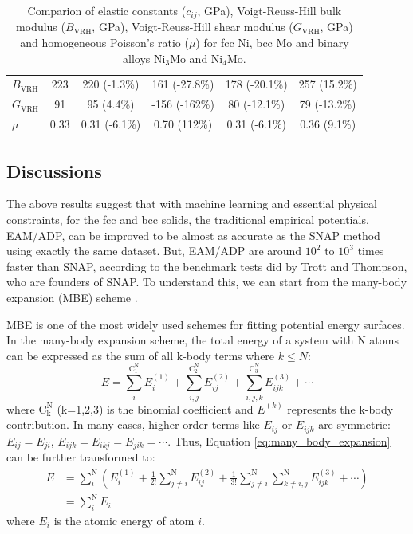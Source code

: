 \documentclass[final,3p,times]{elsarticle}
\begin{document}
\begin{table}
\begin{tabular}{lccccc}
$B_{\mathrm{VRH}}$ & 223  & 220 (-1.3\%)     & 161 (-27.8\%)   & 178 (-20.1\%) & 257 (15.2\%)  \\
$G_{\mathrm{VRH}}$ & 91   & 95 (4.4\%)       & -156 (-162\%)   & 80 (-12.1\%)  & 79 (-13.2\%)  \\
$\mu$              & 0.33 & 0.31 (-6.1\%)    & 0.70 (112\%)    & 0.31 (-6.1\%) & 0.36 (9.1\%)  \\
\hline
\end{tabular}
\caption{\label{table:NiMo_elastic_constants}
Comparion of elastic constants ($c_{ij}$, GPa), Voigt-Reuss-Hill bulk modulus 
($B_{\mathrm{VRH}}$, GPa), Voigt-Reuss-Hill shear modulus ($G_{\mathrm{VRH}}$, 
GPa) and homogeneous Poisson's ratio ($\mu$) for fcc Ni, bcc Mo and binary 
alloys Ni$_{3}$Mo and Ni$_{4}$Mo.
}
\end{table}

% 
%
\subsection{Discussions}
\label{sec:discussions}

The above results suggest that with machine learning and essential physical 
constraints, for the fcc and bcc solids, the traditional empirical potentials, 
EAM/ADP, can be improved to be almost as accurate as the SNAP method using 
exactly the same dataset. But, EAM/ADP are around $10^2$ to $10^3$ times faster 
than SNAP, according to the benchmark tests did by Trott and Thompson, who are 
founders of SNAP\cite{SnapBenchmark}. To understand this, we can start from 
the many-body expansion (MBE) scheme \cite{kCON}.

MBE is one of the most widely used schemes for fitting potential energy 
surfaces. In the many-body expansion scheme, the total energy of a system with N 
atoms can be expressed as the sum of all k-body terms where $k \le N$:
\begin{equation}
\label{eq:many_body_expansion}
E = 
\sum_{i}^{\mathrm{C^N_1}}{E^{(1)}_{i}} +
\sum_{i,j}^{\mathrm{C^N_2}}{E^{(2)}_{ij}} + 
\sum_{i,j,k}^{\mathrm{C^N_3}}{E^{(3)}_{ijk}} + \cdots 
\end{equation}
where $\mathrm{C^N_k}$ (k=1,2,3) is the binomial coefficient and $E^{(k)}$ 
represents the k-body contribution. In many cases, higher-order terms like 
$E_{ij}$ or 
$E_{ijk}$ are symmetric: $E_{ij}=E_{ji}$, $E_{ijk}=E_{ikj}=E_{jik}=\cdots$. 
Thus, Equation \ref{eq:many_body_expansion} can be further transformed to:
\begin{align}
\label{eq:MBE_atomic}
E & = \sum_{i}^{\mathrm{N}}{\left(
    E^{(1)}_{i} + 
    \frac{1}{2!}\sum_{j \ne i}^{\mathrm{N}}{E^{(2)}_{ij}} +
    \frac{1}{3!}\sum_{j \ne i}^{\mathrm{N}}{
        \sum_{k \ne i,j}^{\mathrm{N}}{E^{(3)}_{ijk}}
    } +
    \cdots
\right)} \nonumber \\
& = \sum_{i}^{\mathrm{N}}{E_{i}}
\end{align}
where $E_{i}$ is the atomic energy of atom $i$. 
\end{document}
